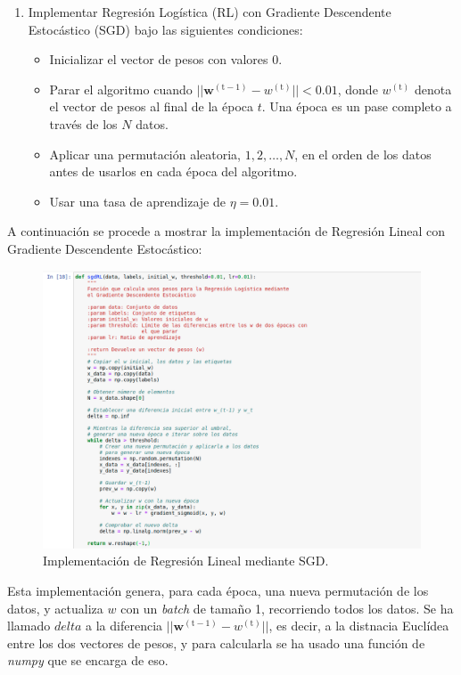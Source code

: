 \documentclass[11pt,a4paper]{article}
\begin{document}
\begin{enumerate}[label=\textit{\alph*})]
	\item Implementar Regresión Logística (RL) con Gradiente Descendente Estocástico (SGD)
	bajo las siguientes condiciones:
	
	\begin{itemize}
		\item Inicializar el vector de pesos con valores 0.
		\item Parar el algoritmo cuando
		$||\mathbf{w}^{(\text{t}-1)} - w^{(\text{t})} || < 0.01$, donde $w^{(\text{t})}$ denota el
		vector de pesos al final de la época $t$. Una época es un pase completo a través de los $N$
		datos.
		\item Aplicar una permutación aleatoria, $1, 2, \dots , N$, en el orden de los datos antes de
		usarlos en cada época del algoritmo.
		\item Usar una tasa de aprendizaje de $\eta = 0.01$.
	\end{itemize}
\end{enumerate}

A continuación se procede a mostrar la implementación de Regresión Lineal con Gradiente Descendente
Estocástico:

\begin{figure}[H]
\centering
\includegraphics[scale=0.4]{img/sgdRL.png}
\caption{Implementación de Regresión Lineal mediante SGD.}
\end{figure}

Esta implementación genera, para cada época, una nueva permutación de los datos, y actualiza $w$ con
un \textit{batch} de tamaño 1, recorriendo todos los datos. Se ha llamado $delta$ a la diferencia
$||\mathbf{w}^{(\text{t}-1)} - w^{(\text{t})} ||$, es decir, a la distnacia Euclídea entre los
dos vectores de pesos, y para calcularla se ha usado una función de \textit{numpy} que se encarga
de eso.
\end{document}
